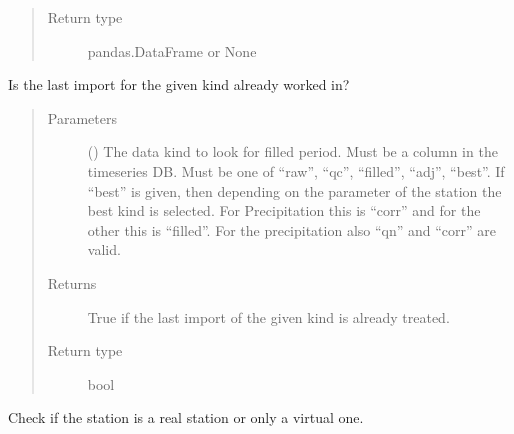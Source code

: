 \documentclass[letterpaper,10pt,english]{sphinxmanual}
\begin{document}
\begin{fulllineitems}
\begin{fulllineitems}
\begin{quote}
\begin{description}
\item[{Return type}] \leavevmode
\sphinxAtStartPar
pandas.DataFrame or None

\end{description}\end{quote}

\end{fulllineitems}


\begin{fulllineitems}
\label{\detokenize{weatherDB:weatherDB.station.StationBase.is_last_imp_done}}
\sphinxAtStartPar
Is the last import for the given kind already worked in?
\begin{quote}\begin{description}
\item[{Parameters}] \leavevmode
\sphinxAtStartPar
{} () \textendash{} The data kind to look for filled period.
Must be a column in the timeseries DB.
Must be one of “raw”, “qc”, “filled”, “adj”, “best”.
If “best” is given, then depending on the parameter of the station the best kind is selected.
For Precipitation this is “corr” and for the other this is “filled”.
For the precipitation also “qn” and “corr” are valid.

\item[{Returns}] \leavevmode
\sphinxAtStartPar
True if the last import of the given kind is already treated.

\item[{Return type}] \leavevmode
\sphinxAtStartPar
bool

\end{description}\end{quote}

\end{fulllineitems}


\begin{fulllineitems}
\label{\detokenize{weatherDB:weatherDB.station.StationBase.is_virtual}}
\sphinxAtStartPar
Check if the station is a real station or only a virtual one.


\end{fulllineitems}
\end{fulllineitems}
\end{document}

